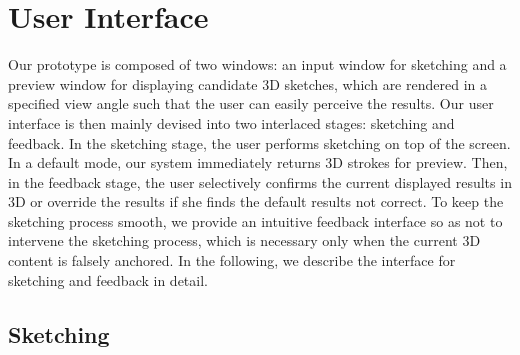 %
%
%

\section{User Interface}

Our prototype is composed of two windows: an input window for sketching and a preview window for displaying candidate 3{D} sketches, which are rendered in a specified view angle such that the user can easily perceive the results. Our user interface is then mainly devised into two interlaced stages: sketching and feedback. In the sketching stage, the user performs sketching on top of the screen. In a default mode, our system immediately returns 3{D} strokes for preview. Then, in the feedback stage, the user selectively confirms the current displayed results in 3{D} or override the results if she finds the default results not correct. To keep the sketching process smooth, we provide an intuitive feedback interface so as not to intervene the sketching process, which is necessary only when the current 3{D} content is falsely anchored.
In the following, we describe the interface for sketching and feedback in detail.

\subsection{Sketching}



